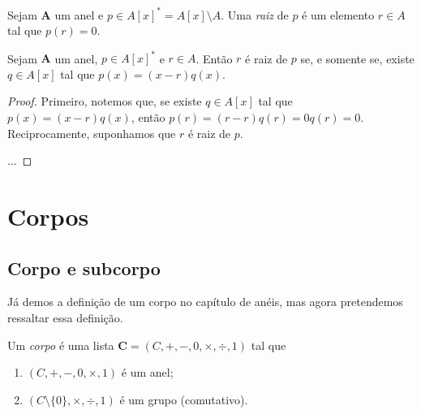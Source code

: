 \begin{definition}
	Sejam $\bm A$ um anel e $p \in A[x]^* = A[x] \setminus A$. Uma \emph{raiz} de $p$ é um elemento $r \in A$ tal que $p(r)=0$.
\end{definition}

\begin{proposition}
	Sejam $\bm A$ um anel, $p \in A[x]^*$ e $r \in A$. Então $r$ é raiz de $p$ se, e somente se, existe $q \in A[x]$ tal que $p(x)=(x-r)q(x)$.
\end{proposition}
\begin{proof}
	Primeiro, notemos que, se existe $q \in A[x]$ tal que $p(x)=(x-r)q(x)$, então $p(r)=(r-r)q(r)=0q(r)=0$. Reciprocamente, suponhamos que $r$ é raiz de $p$.

	...
\end{proof}





\cleardoublepage





\section{Corpos}

\subsection{Corpo e subcorpo}

Já demos a definição de um corpo no capítulo de anéis, mas agora pretendemos ressaltar essa definição.


\begin{definition}
Um \emph{corpo} é uma lista $\bm C = (C,+,-,0,\times,\div,1)$ tal que
	\begin{enumerate}
	\item $(C,+,-,0,\times,1)$ é um anel;
	\item $(C \setminus \{0\},\times,\div,1)$ é um grupo (comutativo).
	\end{enumerate} 
\end{definition}

